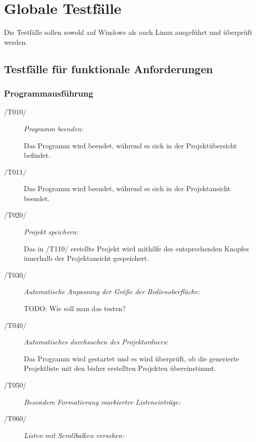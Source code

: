 \section{Globale Testfälle}

Die Testfälle sollen sowohl auf Windows als auch Linux ausgeführt und überprüft werden.


\subsection{Testfälle für funktionale Anforderungen}
	
	\subsubsection{Programmausführung}
	
		\begin{description}

			\item[/T010/] \textit{Programm beenden:}\par Das Programm wird beendet, während es sich in der Projektübersicht befindet.
			\item[/T011/] Das Programm wird beendet, während es sich in der Projektansicht beendet.
				
			\item[/T020/] \textit{Projekt speichern:}\par Das in /T110/ erstellte Projekt wird mithilfe des entsprechenden Knopfes innerhalb der Projektansicht gespeichert. 
				
			\item[/T030/] \textit{Automatische Anpassung der Größe der Bedienoberfläche:}\par TODO: Wie soll man das testen?	
			
			\item[/T040/] \textit{Automatisches durchsuchen des Projektordners:}\par Das Programm wird gestartet und es wird überprüft, ob die generierte Projektliste mit den bisher erstellten Projekten übereinstimmt.
		
			\item[/T050/] \textit{Besondere Formatierung markierter Listeneinträge:}\par
			
			\item[/T060/] \textit{Listen mit Scrollbalken versehen:}\par
			
		\end{description}

